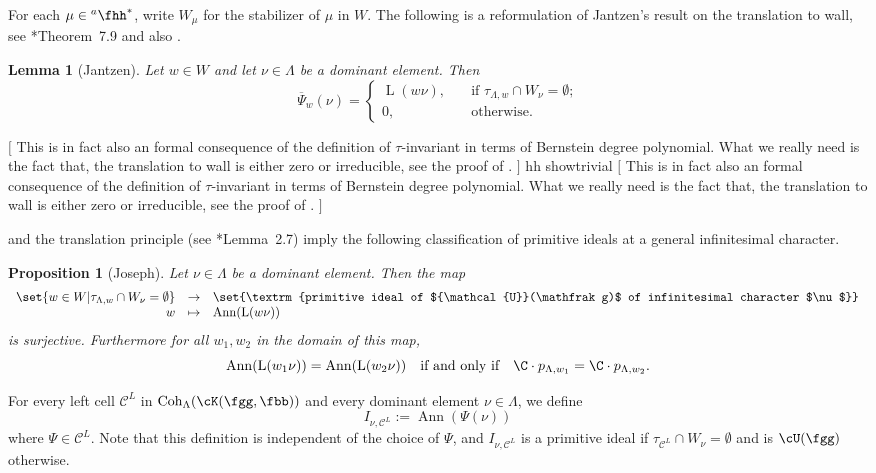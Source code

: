 \documentclass[12pt]{amsart}
\newcommand{\trivial}[2][]{\if\relax\detokenize{#1}\relax
  {%
      \color{orange} \vspace{0em}$[$#2$]$
      \color{black}
  }
  \else
\ifx#1h
\ifcsname showtrivial\endcsname
{%
    \color{orange}\vspace{0em}$[$#2$]$
    \color{black}
}
\fi
\else {\red Wrong argument!} \fi
\fi
}
\def\subset{\subseteq}
\newcommand{\CC}{{\mathcal {C}}}
\newcommand{\CO}{{\mathcal {O}}}
\newcommand{\CU}{{\mathcal {U}}}
\DeclareMathOperator{\Ann}{Ann}
\newcommand{\oL}{\operatorname{L}}
\newcommand{\g}{\mathfrak g}
\numberwithin{equation}{section}
\newtheorem{lem}[thm]{Lemma}
\newtheorem{prop}[thm]{Proposition}
\theoremstyle{remark}
\def\hha{{}^a\fhh}
\def\Coh{\mathrm{Coh}}
\begin{document}
For each $\mu\in \hha^*$, write $W_\mu$ for the stabilizer of $\mu$ in $W$. The following is a reformulation of Jantzen's
result on the translation to wall, see \cite{H}*{Theorem~7.9} and
also \cite[Theorem~7.3.22]{Vg}.
\begin{lem}[Jantzen]\label{prop:Jantzen}
Let $w\in W$ and let  $\nu\in \Lambda$ be a dominant element. Then
\[
\overline \Psi_w(\nu)=
\left\{
   \begin{array}{ll}
    \oL(w\nu),\quad & \text{if $\tau_{\Lambda, w}\cap W_{\nu} = \emptyset$;} \\
       0, \quad &\textrm{otherwise}.
   \end{array}
\right.
\]
\end{lem}
\trivial[h]{
This is in fact also an formal consequence of the definition of $\tau$-invariant in terms of
Bernstein degree polynomial. What we really need is the fact that,
the translation to wall is either zero or irreducible, see the proof of
\cite[Theorem~7.3.22]{Vg}.
}

 and the translation principle (see \cite{V1}*{Lemma~2.7})
imply the following classification of primitive ideals at a general infinitesimal character.

\begin{prop}[Joseph]\label{primitivei}
Let $\nu\in \Lambda$ be a dominant element. Then the map
\[
\begin{array}{rcl}
  \set{w\in W | \tau_{\Lambda, w}\cap W_\nu = \emptyset} & \rightarrow &
 \set{\textrm{primitive ideal of $\CU(\g)$ of infinitesimal character $\nu$}}\\
 w & \mapsto & \Ann( \oL(w \nu))
\end{array}
\]
is surjective. Furthermore for all $w_1, w_2$ in the domain of this map,
\[
  \Ann(\oL(w_1\nu))=\Ann(\oL(w_2\nu))\quad \textrm{if and only if}\quad \C\cdot p_{\Lambda, w_1}=\C\cdot p_{\Lambda, w_2}.
\]
\end{prop}


For every left cell $\CC^L$ in $\Coh_\Lambda(\cK(\fgg,\fbb))$
and every dominant element $\nu\in \Lambda$,
we define
\begin{equation}\label{eq:ICC}
I_{\nu,\CC^{L}} := \Ann(\Psi(\nu))
\end{equation}
where $\Psi\in \CC^L$.
Note that this definition is independent of the choice of $\Psi$, and $I_{\nu,\CC^L}$
is a primitive ideal if $\tau_{\CC^L}\cap W_\nu = \emptyset$ and
is $\cU(\fgg)$ otherwise.
\end{document}
